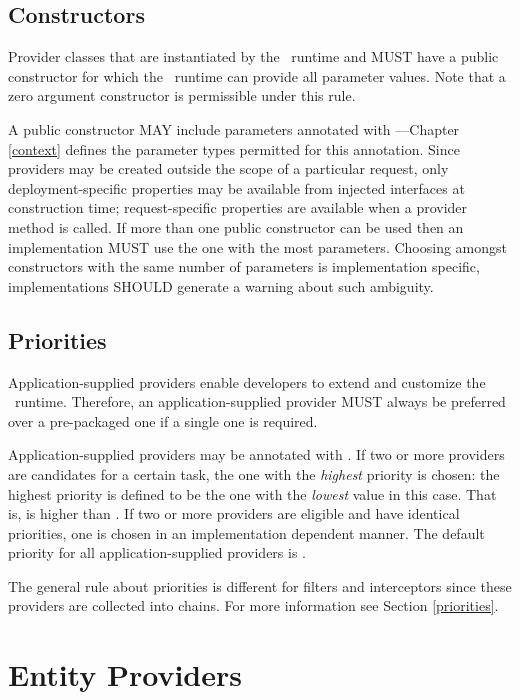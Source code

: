 \subsection{Constructors}
\label{provider_class_constructor}

Provider classes that are instantiated by the \jaxrs\ runtime and MUST have a public constructor for which the \jaxrs\ runtime can provide all parameter values. Note that a zero argument constructor is permissible under this rule.

A public constructor MAY include parameters annotated with \Context ---Chapter \ref{context} defines the parameter types permitted for this annotation. Since providers may be created outside the scope of a particular request, only deployment-specific properties may be available from injected interfaces at construction time; request-specific properties are available when a provider method is called. If more than one public constructor can be used then an implementation MUST use the one with the most parameters. Choosing amongst constructors with the same number of parameters is implementation specific, implementations SHOULD generate a warning about such ambiguity.

\subsection{Priorities}
\label{provider_priorities}

Application-supplied providers enable developers to extend and customize the \jaxrs\ runtime. Therefore, an application-supplied provider MUST always be preferred over a pre-packaged one if a single one is required.

Application-supplied providers may be annotated with \Priority. If two or more providers are candidates for a certain task, the one with the \emph{highest} priority is chosen: the highest priority is defined to be the one with the \emph{lowest} value in this case. That is,  is higher than . If two or more providers are eligible and have identical priorities, one is chosen in an implementation dependent manner. The default priority for all application-supplied providers is . 

The general rule about priorities is different for filters and interceptors since these providers are collected into chains. For more information see Section \ref{priorities}.

\section{Entity Providers}
\label{entity_providers}

